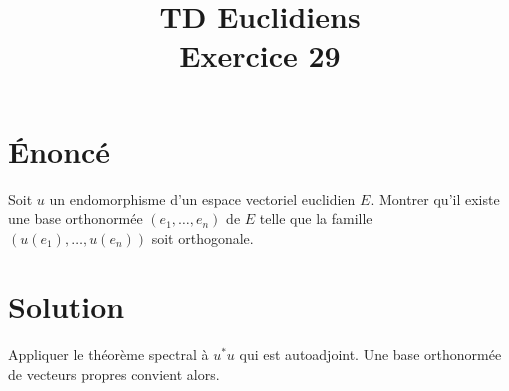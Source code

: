 \documentclass[french]{article}
\title{TD Euclidiens\\ Exercice 29}
\date{}
\newcommand{\st}{^*}
\begin{document}
\maketitle

\section{Énoncé}
Soit $u$ un endomorphisme d'un espace vectoriel euclidien $E$. Montrer qu'il existe une base orthonormée $(e_1,\ldots,e_n)$ de $E$ telle que la famille $(u(e_1),\ldots,u(e_n))$ soit orthogonale.
\section{Solution}
Appliquer le théorème spectral à $u\st u$ qui est autoadjoint. Une base orthonormée de vecteurs propres convient alors.
\end{document}
